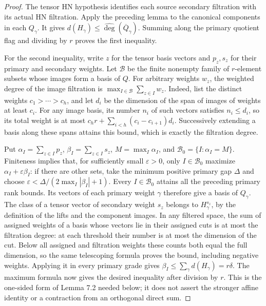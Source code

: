 \begin{proof}
The tensor HN hypothesis identifies each source secondary filtration
with its actual HN filtration. Apply the preceding lemma to the canonical
components in each $Q_\gamma$. It gives
$d(H_\gamma)\le\widehat{\deg}(\overline Q_\gamma)$.
Summing along the primary quotient flag and dividing by $r$ proves
the first inequality.

For the second inequality, write $z$ for the tensor basis vectors and
$p_z,s_z$ for their primary and secondary weights. Let $\mathcal B$ be
the finite nonempty family of $r$-element subsets whose images form a
basis of $Q$. For arbitrary weights $w_z$, the weighted degree of the
image filtration is $\max_{I\in\mathcal B}\sum_{z\in I}w_z$.
Indeed, list the distinct weights $c_1>\cdots>c_h$, and let $d_i$ be
the dimension of the span of images of weights at least $c_i$.
For any image basis, its number $n_i$ of such vectors satisfies $n_i\le d_i$,
so its total weight is at most
$c_h r+\sum_{i<h}(c_i-c_{i+1})d_i$.
Successively extending a basis along these spans attains this bound,
which is exactly the filtration degree.

Put $\alpha_I=\sum_{z\in I}p_z$, $\beta_I=\sum_{z\in I}s_z$,
$M=\max_I\alpha_I$, and $\mathcal B_0=\{I:\alpha_I=M\}$.
Finiteness implies that, for sufficiently small $\varepsilon>0$,
only $I\in\mathcal B_0$ maximize $\alpha_I+\varepsilon\beta_I$:
if there are other sets, take the minimum positive primary gap $\Delta$
and choose $\varepsilon<\Delta/(2\max_I|\beta_I|+1)$.
Every $I\in\mathcal B_0$ attains all the preceding primary rank bounds.
Its vectors of each primary weight $\gamma$ therefore give a basis of
$Q_\gamma$. The class of a tensor vector of secondary weight $s_z$
belongs to $H_\gamma^{s_z}$, by the definition of the lifts and the
component images. In any filtered space, the sum of assigned weights
of a basis whose vectors lie in their assigned cuts is at most the
filtration degree: at each threshold their number is at most the
dimension of the cut. Below all assigned and filtration weights these
counts both equal the full dimension, so the same telescoping formula
proves the bound, including negative weights.
Applying it in every primary grade gives
$\beta_I\le\sum_\gamma d(H_\gamma)=r\delta$.
The maximum formula now gives the desired inequality after division by $r$.
This is the one-sided form of Lemma 7.2 needed below; it does not assert
the stronger affine identity or a contraction from an orthogonal direct sum.
\end{proof}

